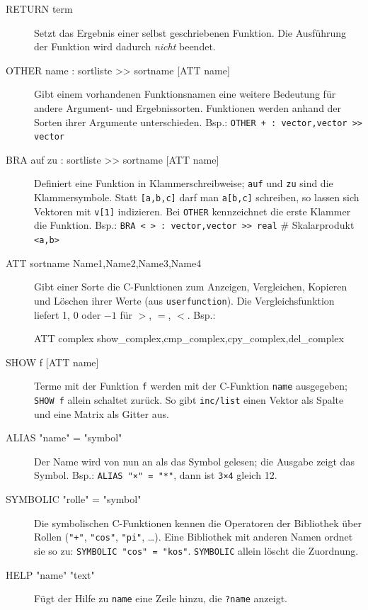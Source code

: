 \documentclass[a4paper,11pt]{article}
\newcommand{\kw}[1]{\texttt{#1}}
\begin{document}
\begin{description}
\item[RETURN term]
  Setzt das Ergebnis einer selbst geschriebenen Funktion. Die Ausführung
  der Funktion wird dadurch \emph{nicht} beendet.

\item[OTHER name : sortliste >{}> sortname {[}ATT name{]}]
  Gibt einem vorhandenen Funktionsnamen eine weitere Bedeutung für andere
  Argument- und Ergebnissorten. Funktionen werden anhand der Sorten ihrer
  Argumente unterschieden. Bsp.: \kw{OTHER + : vector,vector >{}> vector}

\item[BRA auf zu : sortliste >{}> sortname {[}ATT name{]}]
  Definiert eine Funktion in Klammerschreibweise; \kw{auf} und \kw{zu}
  sind die Klammersymbole. Statt \kw{[a,b,c]} darf man \kw{a[b,c]}
  schreiben, so lassen sich Vektoren mit \kw{v[1]} indizieren. Bei
  \kw{OTHER} kennzeichnet die erste Klammer die Funktion.
  Bsp.: \kw{BRA < > : vector,vector >{}> real} \quad \# Skalarprodukt \kw{<a,b>}

\item[ATT sortname Name1,Name2,Name3,Name4]
  Gibt einer Sorte die C-Funktionen zum Anzeigen, Vergleichen, Kopieren
  und Löschen ihrer Werte (aus \kw{userfunction}). Die
  Vergleichsfunktion liefert 1, 0 oder $-1$ für $>$, $=$, $<$.
  Bsp.:
\begin{beispiel}
ATT complex show_complex,cmp_complex,cpy_complex,del_complex
\end{beispiel}

\item[SHOW f {[}ATT name{]}]
  Terme mit der Funktion \kw{f} werden mit der C-Funktion \kw{name}
  ausgegeben; \kw{SHOW f} allein schaltet zurück. So gibt \kw{inc/list}
  einen Vektor als Spalte und eine Matrix als Gitter aus.

\item[ALIAS "name" = "symbol"]
  Der Name wird von nun an als das Symbol gelesen; die Ausgabe zeigt das
  Symbol. Bsp.: \kw{ALIAS "×" = "*"}, dann ist \kw{3×4} gleich 12.

\item[SYMBOLIC "rolle" = "symbol"]
  Die symbolischen C-Funktionen kennen die Operatoren der Bibliothek über
  Rollen (\kw{"+"}, \kw{"cos"}, \kw{"pi"}, \ldots). Eine Bibliothek mit
  anderen Namen ordnet sie so zu: \kw{SYMBOLIC "cos" = "kos"}.
  \kw{SYMBOLIC} allein löscht die Zuordnung.

\item[HELP "name" "text"]
  Fügt der Hilfe zu \kw{name} eine Zeile hinzu, die \kw{?name} anzeigt.
\end{description}
\end{document}
